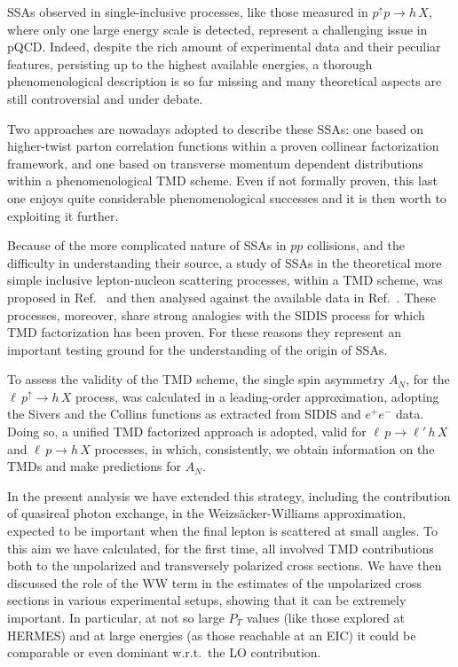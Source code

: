 \documentclass[nofootinbib,superscriptaddress,aps]{revtex4}
\newcommand{\pup}{p^\uparrow}
\begin{document}
SSAs observed in single-inclusive processes, like those measured in $p^\uparrow p\to h\, X$, where only one large energy scale is detected, represent a challenging issue in pQCD. Indeed, despite the rich amount of experimental data and their peculiar features, persisting up to the highest available energies, a thorough phenomenological description is so far missing and many theoretical aspects are still controversial and under debate.

Two approaches are nowadays adopted to describe these SSAs: one based on higher-twist parton correlation functions within a proven collinear factorization framework, and one based on transverse momentum dependent distributions within a phenomenological TMD scheme. Even if not formally proven, this last one enjoys quite considerable phenomenological successes and it is then worth to exploiting it further.

Because of the more complicated nature of SSAs in $pp$ collisions, and the difficulty in understanding their source, a study of SSAs in the theoretical more simple inclusive lepton-nucleon scattering processes, within a TMD scheme, was proposed in Ref.~\cite{Anselmino:2009pn} and then analysed against the available data in Ref.~\cite{Anselmino:2014eza}. These processes, moreover, share strong analogies with the SIDIS process for which TMD factorization has been proven. For these reasons they represent an important testing ground for the understanding of the origin of SSAs.

To assess the validity of the TMD scheme, the single spin asymmetry $A_N$, for the $\ell \, \pup \to h \, X$ process, was calculated in a leading-order approximation, adopting the Sivers and the Collins functions as extracted from SIDIS and $e^+e^-$ data.
Doing so, a unified TMD factorized approach is adopted, valid for $\ell \, p \to \ell' \, h \, X$ and $\ell \, p \to h \, X$ processes, in which, consistently, we obtain information on the TMDs and make predictions for $A_N$.

In the present analysis we have extended this strategy, including the contribution of quasireal photon exchange, in the Weizs\"acker-Williams approximation, expected to be important when the final lepton is scattered at small angles. To this aim we have calculated, for the first time, all involved TMD contributions both to the unpolarized and transversely polarized cross sections. We have then discussed the role of the WW term in the estimates of the unpolarized cross sections in various experimental setups, showing that it can be extremely important. In particular, at not so large $P_T$ values (like those explored at HERMES) and at large energies (as those reachable at an EIC) it could be comparable or even dominant w.r.t.~the LO contribution.
\end{document}
